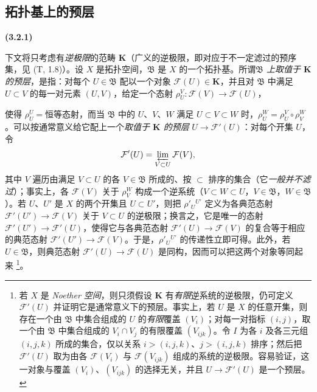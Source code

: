 \documentclass[UTF8,fontset=none,11pt,oneside,openany]{ctexbook}
\newenvironment{env}[1][]{%
  \par\medskip\noindent\textbf{(#1)}\ %
}{\par}
\newcommand{\oldpage}[2][]{%
  \hypertarget{ega-source-page-#1-#2}{}%
  \marginnote{\scriptsize\textbf{#1}~|~#2}\ignorespaces}
\let\EGAOriginalLabel\label
\renewcommand{\label}[1]{\phantomsection\EGAOriginalLabel{#1}}
\begin{document}
\subsection{拓扑基上的预层}
\label{subsection:0.3.2-fr}

\begin{env}[3.2.1]
\label{0.3.2.1-fr}
下文将只考虑有\emph{逆极限}的范畴 $\mathbf{K}$（广义的逆极限，即对应于不一定滤过的预序集，见 (T, 1.8)）。设 $X$ 是拓扑空间，$\mathfrak{B}$ 是 $X$ 的一个拓扑基。所谓\emph{$\mathfrak{B}$ 上取值于 $\mathbf{K}$ 的预层}，是指：对每个 $U\in\mathfrak{B}$ 配以一个对象 $\mathcal{F}(U)\in\mathbf{K}$，并且对 $\mathfrak{B}$ 中满足 $U\subset V$ 的每一对元素 $(U,V)$，给定一个态射
$\rho_U^V:\mathcal{F}(V)\to\mathcal{F}(U)$，

\oldpage[0\textsubscript{I}]{26}

使得 $\rho_U^U=\text{恒等态射}$，而当 $\mathfrak{B}$ 中的 $U$、$V$、$W$ 满足 $U\subset V\subset W$ 时，$\rho_U^W=\rho_U^V\circ\rho_V^W$。可以按通常意义给它配上一个\emph{取值于 $\mathbf{K}$ 的预层} $U\to\mathcal{F}'(U)$：对每个开集 $U$，令
\[
  \mathcal{F}'(U)=\varprojlim_{V\subset U}\mathcal{F}(V),
\]
其中 $V$ 遍历由满足 $V\subset U$ 的各 $V\in\mathfrak{B}$ 所成的、按 $\subset$ 排序的集合（它\emph{一般并不滤过}）；事实上，各 $\mathcal{F}(V)$ 关于 $\rho_V^W$ 构成一个逆系统（$V\subset W\subset U$，$V\in\mathfrak{B}$，$W\in\mathfrak{B}$）。若 $U$、$U'$ 是 $X$ 的两个开集且 $U\subset U'$，则把 $\rho'_U{}^{U'}$ 定义为各典范态射 $\mathcal{F}'(U')\to\mathcal{F}(V)$ 关于 $V\subset U$ 的逆极限；换言之，它是唯一的态射 $\mathcal{F}'(U')\to\mathcal{F}'(U)$，使得它与各典范态射 $\mathcal{F}'(U)\to\mathcal{F}(V)$ 的复合等于相应的典范态射 $\mathcal{F}'(U')\to\mathcal{F}(V)$。于是，$\rho'_U{}^{U'}$ 的传递性立即可得。此外，若 $U\in\mathfrak{B}$，则典范态射 $\mathcal{F}'(U)\to\mathcal{F}(U)$ 是同构，因而可以把这两个对象等同起来%
\footnote{若 $X$ 是 \emph{Noether 空间}，则只须假设 $\mathbf{K}$ 有\emph{有限}逆系统的逆极限，仍可定义 $\mathcal{F}'(U)$ 并证明它是通常意义下的预层。事实上，若 $U$ 是 $X$ 的任意开集，则存在一个由 $\mathfrak{B}$ 中集合组成的 $U$ 的\emph{有限}覆盖 $(V_i)$；对每一对指标 $(i,j)$，取一个由 $\mathfrak{B}$ 中集合组成的 $V_i\cap V_j$ 的有限覆盖 $(V_{ijk})$。令 $I$ 为各 $i$ 及各三元组 $(i,j,k)$ 所成的集合，仅以关系 $i>(i,j,k)$、$j>(i,j,k)$ 排序；然后把 $\mathcal{F}'(U)$ 取为由各 $\mathcal{F}(V_i)$ 与 $\mathcal{F}(V_{ijk})$ 组成的系统的逆极限。容易验证，这一对象与覆盖 $(V_i)$、$(V_{ijk})$ 的选择无关，并且 $U\to\mathcal{F}'(U)$ 是一个预层。}。
\end{env}
\end{document}
